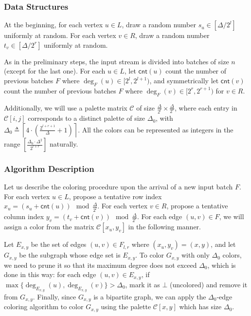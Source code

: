 \documentclass[11pt,a4paper]{article}
\newcommand{\cnt}{\mathsf{cnt}}
\newcommand{\mat}{\mathcal{C}}
\begin{document}
\subsubsection{Data Structures}  
At the beginning, for each vertex $u \in L$, draw a random number $s_u \in [\Delta / 2^l]$ uniformly at random. For each vertex $v \in R$, draw a random number $t_v \in [\Delta / 2^r]$ uniformly at random. 

As in the preliminary steps, the input stream is divided into batches of size $n$ (except for the last one). For each $u\in L$, let $\cnt(u)$ count the number of previous batches $F$ where $\deg_{F}(u)\in [2^l, 2^{l+1})$, and symmetrically let $\cnt(v)$ count the number of previous batches $F$ where $\deg_F(v)\in [2^r, 2^{r+1})$ for $v\in R$.

Additionally, we will use a palette matrix $\mat$ of size $\frac{\Delta}{2^l} \times \frac{\Delta}{2^r}$, where each entry in $\mat[i,j]$ corresponds to a distinct palette of size $\Delta_0$, with $\Delta_0 \triangleq \left\lceil 4\cdot \left( \frac{2^{l+r+1}}{\Delta} + 1 \right) \right\rceil$. All the colors can be represented as integers in the range $\left[\frac{\Delta_0\cdot\Delta^2}{2^{l+r}}\right]$ naturally.


\subsubsection{Algorithm Description}
Let us describe the coloring procedure upon the arrival of a new input batch $F$. For each vertex $u \in L$, propose a tentative row index $x_u = (s_u + \cnt(u)) \mod \frac{\Delta}{2^l}$. For each vertex $v \in R$, propose a tentative column index $y_v = (t_v + \cnt(v)) \mod \frac{\Delta}{2^r}$. For each edge $(u, v) \in F$, we will assign a color from the matrix $\mat[x_u, y_v]$ in the following manner.

Let $E_{x, y}$ be the set of edges $(u, v) \in F_{l, r}$ where $(x_u, y_v) = (x, y)$, and let $G_{x, y}$ be the subgraph whose edge set is $E_{x, y}$. To color $G_{x, y}$ with only $\Delta_0$ colors, we need to prune it so that its maximum degree does not exceed $\Delta_0$, which is done in this way: for each edge $(u, v) \in E_{x, y}$, if $\max\{\deg_{E_{x, y}}(u), \deg_{E_{x, y}}(v)\} > \Delta_0$, mark it as $\bot$ (uncolored) and remove it from $G_{x, y}$. Finally, since $G_{x, y}$ is a bipartite graph, we can apply the $\Delta_0$-edge coloring algorithm \cite{cole2001edge} to color $G_{x, y}$ using the palette $\mat[x, y]$ which has size $\Delta_0$.
\end{document}
